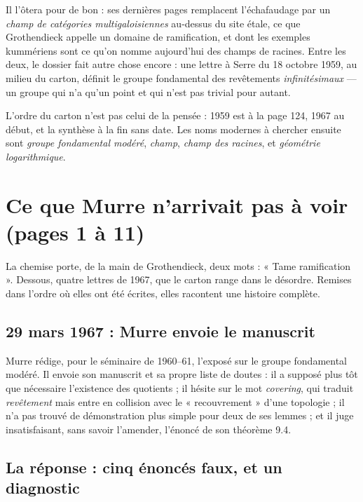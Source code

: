 \documentclass[11pt,a4paper]{article}
\begin{document}
\begin{resume}
Il l'ôtera pour de bon : ses dernières pages remplacent l'échafaudage par un
\emph{champ de catégories multigaloisiennes} au-dessus du site étale, ce que
Grothendieck appelle un domaine de ramification, et dont les exemples
kummériens sont ce qu'on nomme aujourd'hui des champs de racines. Entre les
deux, le dossier fait autre chose encore : une lettre à Serre du 18 octobre
1959, au milieu du carton, définit le groupe fondamental des revêtements
\emph{infinitésimaux} — un groupe qui n'a qu'un point et qui n'est pas trivial
pour autant.

L'ordre du carton n'est pas celui de la pensée : 1959 est à la page 124, 1967
au début, et la synthèse à la fin sans date. Les noms modernes à chercher
ensuite sont \emph{groupe fondamental modéré}, \emph{champ}, \emph{champ des
racines}, et \emph{géométrie logarithmique}.

\end{resume}

\section*{Ce que Murre n'arrivait pas à voir (pages 1 à 11)}

La chemise porte, de la main de Grothendieck, deux mots : « Tame
ramification ». Dessous, quatre lettres de 1967, que le carton range dans le
désordre. Remises dans l'ordre où elles ont été écrites, elles racontent une
histoire complète.

\subsection*{29 mars 1967 : Murre envoie le manuscrit}

Murre rédige, pour le séminaire de 1960--61, l'exposé sur le groupe fondamental
modéré. Il envoie son manuscrit et sa propre liste de doutes : il a supposé
plus tôt que nécessaire l'existence des quotients ; il hésite sur le mot
\emph{covering}, qui traduit \emph{revêtement} mais entre en collision avec le
« recouvrement » d'une topologie ; il n'a pas trouvé de démonstration plus
simple pour deux de ses lemmes ; et il juge insatisfaisant, sans savoir
l'amender, l'énoncé de son théorème 9.4.

\subsection*{La réponse : cinq énoncés faux, et un diagnostic}
\end{document}
